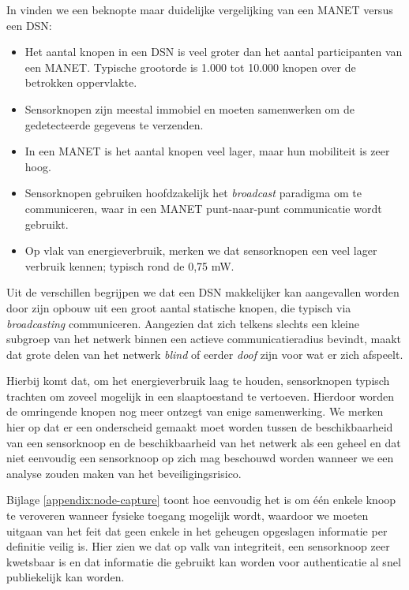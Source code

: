 In \citep{garg2010mobile} vinden we een beknopte maar duidelijke vergelijking
van een MANET versus een DSN:

\begin{itemize}

  \item Het aantal knopen in een DSN is veel groter dan het aantal
  participanten van een MANET. Typische grootorde is 1.000 tot 10.000 knopen
  over de betrokken oppervlakte.

  \item Sensorknopen zijn meestal immobiel en moeten samenwerken om de
  gedetecteerde gegevens te verzenden.

  \item In een MANET is het aantal knopen veel lager, maar hun mobiliteit is
  zeer hoog.

  \item Sensorknopen gebruiken hoofdzakelijk het \emph{broadcast} paradigma om
  te communiceren, waar in een MANET punt-naar-punt communicatie wordt gebruikt.

  \item Op vlak van energieverbruik, merken we dat sensorknopen een veel lager
  verbruik kennen; typisch rond de 0,75 mW.

\end{itemize}

Uit de verschillen begrijpen we dat een DSN makkelijker kan aangevallen worden
door zijn opbouw uit een groot aantal statische knopen, die typisch via
\emph{broadcasting} communiceren. Aangezien dat zich telkens slechts een kleine
subgroep van het netwerk binnen een actieve communicatieradius bevindt, maakt
dat grote delen van het netwerk \emph{blind} of eerder \emph{doof} zijn voor
wat er zich afspeelt.

Hierbij komt dat, om het energieverbruik laag te houden, sensorknopen typisch
trachten om zoveel mogelijk in een slaaptoestand te vertoeven. Hierdoor worden
de omringende knopen nog meer ontzegt van enige samenwerking. We merken hier op
dat er een onderscheid gemaakt moet worden tussen de beschikbaarheid van een
sensorknoop en de beschikbaarheid van het netwerk als een geheel en dat niet
eenvoudig een sensorknoop op zich mag beschouwd worden wanneer we een analyse
zouden maken van het beveiligingsrisico.

Bijlage \ref{appendix:node-capture} toont hoe eenvoudig het is om \'e\'en enkele
knoop te veroveren wanneer fysieke toegang mogelijk wordt, waardoor we moeten
uitgaan van het feit dat geen enkele in het geheugen opgeslagen informatie per
definitie veilig is. Hier zien we dat op valk van integriteit, een sensorknoop
zeer kwetsbaar is en dat informatie die gebruikt kan worden voor authenticatie
al snel publiekelijk kan worden.

